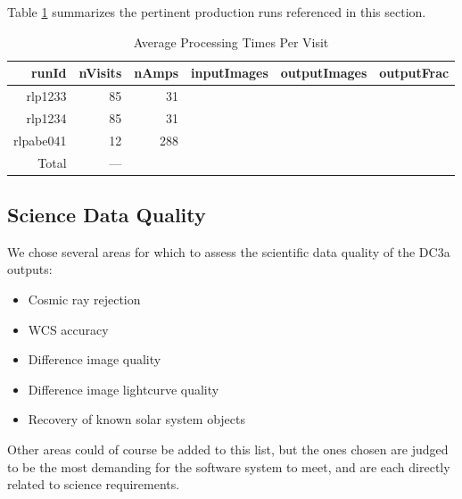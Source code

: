 Table \ref{tbl:runsummary} summarizes the pertinent production runs
referenced in this section.

\begin{table}[hp]
\centering
\caption{Average Processing Times Per Visit
\label{tbl:runsummary}}
\vspace{\baselineskip}
\begin{tabular}{ | r | r | r | r | r | r |}
\hline\hline
runId & nVisits & nAmps & inputImages & outputImages & outputFrac \\ \hline
rlp1233 & 85  & 31 &  &  &  \\ \hline
rlp1234 & 85  & 31 &  &  &  \\ \hline
rlpabe041 & 12  & 288 &  &  &  \\ \hline
Total   & --- &    &  &  &  \\ \hline
\end{tabular}
\end{table}

\subsection{Science Data Quality}
We chose several areas for which to assess the scientific data quality of the DC3a outputs:
\begin{itemize}
\item Cosmic ray rejection
\item WCS accuracy
\item Difference image quality
\item Difference image lightcurve quality
\item Recovery of known solar system objects
\end{itemize}
Other areas could of course be added to this list, but the ones chosen
are judged to be the most demanding for the software system to meet,
and are each directly related to science requirements. 
